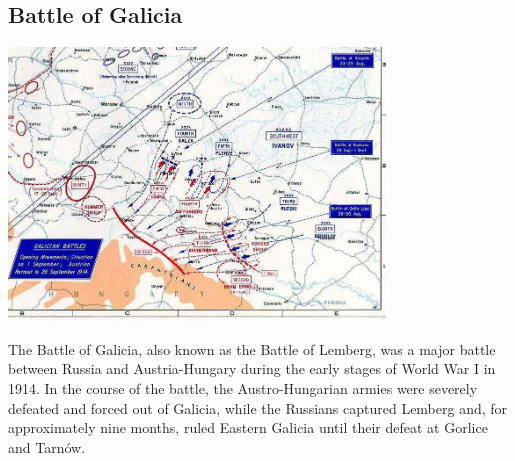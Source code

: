 \documentclass[11pt]{report}
\begin{document}
\subsection{Battle of Galicia}
\vspace{2mm}\begin{center}\includegraphics[width=10cm]{./img/battleOfGalicia.jpg}\end{center}
The Battle of Galicia, also known as the Battle of Lemberg, was a major battle between Russia and Austria-Hungary during the early stages of World War I in 1914. In the course of the battle, the Austro-Hungarian armies were severely defeated and forced out of Galicia, while the Russians captured Lemberg and, for approximately nine months, ruled Eastern Galicia until their defeat at Gorlice and Tarnów.
\end{document}
